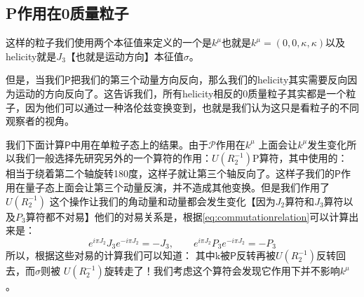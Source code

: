 \subsection{P作用在0质量粒子}
这样的粒子我们使用两个本征值来定义的一个是$ k^\mu $也就是$ k^\mu = (0,0,\kappa,\kappa) $以及helicity就是$ J_3 $【也就是运动方向】本征值$ \sigma $。   


但是，当我们$ \mathsf{P} $把我们的第三个动量方向反向，那么我们的helicity其实需要反向因为运动的方向反向了。这告诉我们，所有helicity相反的0质量粒子其实都是一个粒子，因为他们可以通过一种洛伦兹变换变到，也就是我们认为这只是看粒子的不同观察者的视角。

我们下面计算$ \mathsf{P} $中用在单粒子态上的结果。由于$ \mathscr{P} $作用在$ k^\mu $ 上面会让$ k^\mu $发生变化所以我们一般选择先研究另外的一个算符的作用：$ U(R_2^{-1})\mathrm{P} $算符，其中使用的：
相当于绕着第二个轴旋转180度，这样子就让第三个轴反向了。这样子我们的$ \mathsf{P} $作用在量子态上面会让第三个动量反演，并不造成其他变换。但是我们作用了$ U(R_2^{-1}) $ 这个操作让我们的角动量和动量都会发生变化【因为$ J_2 $算符和$ J_3 $算符以及$ P_3 $算符都不对易】他们的对易关系是，根据\cref{eq:commutationrelation}可以计算出来是：
\[
e^{i\pi J_2} J_3 e^{-i\pi J_2} = -J_3, \qquad
e^{i\pi J_2} P_3 e^{-i\pi J_2} = -P_3
\]
所以，根据这些对易的计算我们可以知道：
其中k被$ \mathsf{P} $反转再被$ U(R_2^{-1}) $反转回去，而$ \sigma $则被  $ U(R_2^{-1}) $旋转走了！我们考虑这个算符会发现它作用下并不影响$ k^\mu $ 。

